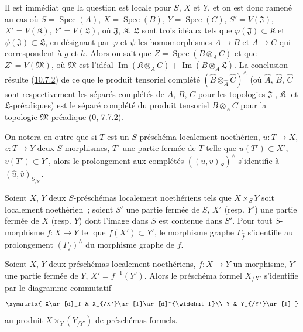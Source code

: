 Il est immédiat que la question est locale pour $S$, $X$ et $Y$, et on
est donc ramené au cas où $S=\operatorname{Spec}(A)$,
$X=\operatorname{Spec}(B)$, $Y=\operatorname{Spec}(C)$,
$S'=V(\mathfrak{J})$, $X'=V(\mathfrak{K})$, $Y'=V(\mathfrak{L})$, où
$\mathfrak{J}$, $\mathfrak{K}$, $\mathfrak{L}$ sont trois idéaux tels
que $\varphi(\mathfrak{J})\subset\mathfrak{K}$ et
$\psi(\mathfrak{J})\subset\mathfrak{L}$, en désignant par $\varphi$ et
$\psi$ les homomorphismes $A\to B$ et $A\to C$ qui correspondent à $g$
et $h$. Alors on sait que $Z=\operatorname{Spec}(B\otimes_A C)$ et que
$Z'=V(\mathfrak{M})$, où $\mathfrak{M}$ est l'idéal
$\operatorname{Im}(\mathfrak{K}\otimes_A C)
+\operatorname{Im}(B\otimes_A\mathfrak{L})$. La conclusion résulte
(\hyperref[I.10.7.2-fr]{10.7.2}) de ce que le produit tensoriel complété
$(\widehat B\otimes_{\widehat A}\widehat C)^\wedge$ (où $\widehat A$,
$\widehat B$, $\widehat C$ sont respectivement les séparés complétés de
$A$, $B$, $C$ pour les topologies $\mathfrak{J}$-, $\mathfrak{K}$- et
$\mathfrak{L}$-préadiques) est le séparé complété du produit tensoriel
$B\otimes_A C$ pour la topologie $\mathfrak{M}$-préadique
(\hyperref[0.7.7.2-fr]{0, 7.7.2}).

On notera en outre que si $T$ est un $S$-préschéma localement
noethérien, $u:T\to X$, $v:T\to Y$ deux $S$-morphismes, $T'$ une partie
fermée de $T$ telle que $u(T')\subset X'$, $v(T')\subset Y'$, alors le
prolongement aux complétés $((u,v)_S)^\wedge$ s'identifie à
$(\widehat u,\widehat v)_{S_{/S'}}$.

\begin{corollary}[10.9.8]
\label{I.10.9.8-fr}
Soient $X$, $Y$ deux $S$-préschémas localement noethériens tels que
$X\times_S Y$ soit localement noethérien~; soient $S'$ une partie fermée
de $S$, $X'$ (resp. $Y'$) une partie fermée de $X$ (resp. $Y$) dont
l'image dans $S$ est contenue dans $S'$. Pour tout $S$-morphisme
$f:X\to Y$ tel que $f(X')\subset Y'$, le morphisme graphe
$\Gamma_{\widehat f}$ s'identifie au prolongement $(\Gamma_f)^\wedge$ du
morphisme graphe de $f$.
\end{corollary}

\begin{corollary}[10.9.9]
\label{I.10.9.9-fr}
Soient $X$, $Y$ deux préschémas localement noethériens, $f:X\to Y$ un
morphisme, $Y'$ une partie fermée de $Y$, $X'=f^{-1}(Y')$. Alors le
préschéma formel $X_{/X'}$ s'identifie par le diagramme commutatif
\[
  \label{I.10.9.9.1-fr}
  \xymatrix{
    X\ar[d]_f &
    X_{/X'}\ar[l]\ar[d]^{\widehat f}\\
    Y &
    Y_{/Y'}\ar[l]
  }
\]
au produit $X\times_Y(Y_{/Y'})$ de préschémas formels.
\end{corollary}

